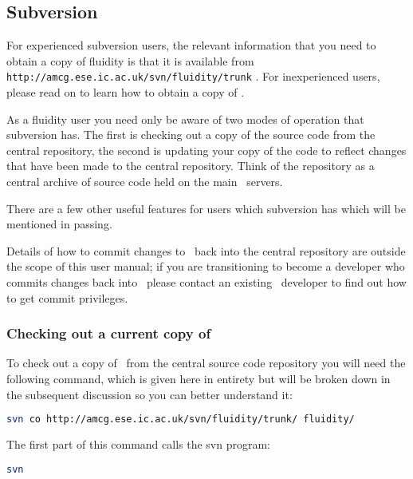 \subsection{Subversion}
\label{sect:subversion}

For experienced subversion users, the relevant information that you need to
obtain a copy of fluidity is that it is available from
\lstinline[language=Bash]+http://amcg.ese.ic.ac.uk/svn/fluidity/trunk+ .
For inexperienced users, please read on to learn how to obtain a copy of \fluidity.

As a fluidity user you need only be aware of two modes of operation that
subversion has. The first is checking out a copy of the source code from the
central repository, the second is updating your copy of the code to reflect
changes that have been made to the central repository. Think of the repository
as a central archive of source code held on the main \fluidity\ servers.

There are a few other useful features for users which subversion has which will
be mentioned in passing.

Details of how to commit changes to \fluidity\ back into the central repository
are outside the scope of this user manual; if you are transitioning to become a
developer who commits changes back into \fluidity\ please contact an existing
\fluidity\ developer to find out how to get commit privileges.

\subsubsection{Checking out a current copy of \fluidity}
\label{sect:subversion_checkout_current}

To check out a copy of \fluidity\ from the central source code repository you
will need the following command, which is given here in entirety but will be
broken down in the subsequent discussion so you can better understand it:

\begin{lstlisting}[language=Bash]
svn co http://amcg.ese.ic.ac.uk/svn/fluidity/trunk/ fluidity/
\end{lstlisting}

The first part of this command calls the svn program:

\begin{lstlisting}[language=Bash]
svn
\end{lstlisting}

